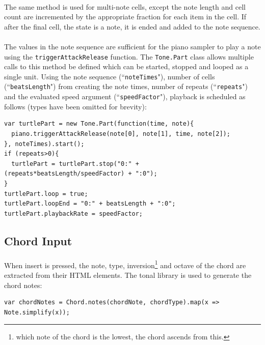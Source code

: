 \paragraph{} The same method is used for multi-note cells, except the note length and cell count are incremented by the appropriate fraction for each item in the cell. If after the final cell, the state is a note, it is ended and added to the note sequence.

\paragraph{} The values in the note sequence are sufficient for the piano sampler to play a note using the \texttt{triggerAttackRelease} function. The \texttt{Tone.Part} class allows multiple calls to this method be defined which can be started, stopped and looped as a single unit. Using the note sequence (``\texttt{noteTimes}"), number of cells (``\texttt{beatsLength}") from creating the note times, number of repeats (``\texttt{repeats}") and the evaluated speed argument (``\texttt{speedFactor}"), playback is scheduled as follows (types have been omitted for brevity):

\begin{verbatim}
var turtlePart = new Tone.Part(function(time, note){
  piano.triggerAttackRelease(note[0], note[1], time, note[2]);
}, noteTimes).start();
if (repeats>0){
  turtlePart = turtlePart.stop("0:" + (repeats*beatsLength/speedFactor) + ":0");
}
turtlePart.loop = true;
turtlePart.loopEnd = "0:" + beatsLength + ":0";
turtlePart.playbackRate = speedFactor;
\end{verbatim}

\subsection{Chord Input}

\paragraph{} When insert is pressed, the note, type, inversion\footnote{which note of the chord is the lowest, the chord ascends from this.} and octave of the chord are extracted from their HTML elements. The tonal library is used to generate the chord notes:

\begin{verbatim}
var chordNotes = Chord.notes(chordNote, chordType).map(x => Note.simplify(x));
\end{verbatim}

